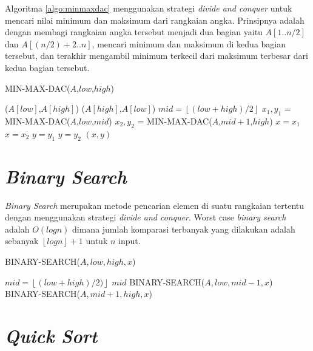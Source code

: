 Algoritma \ref{algo:minmaxdac} menggunakan strategi \textit{divide and conquer} untuk mencari nilai minimum dan maksimum dari rangkaian angka. Prinsipnya adalah dengan membagi rangkaian angka tersebut menjadi dua bagian yaitu $A[1..n/2]$ dan $A[(n/2)+2..n]$, mencari minimum dan maksimum di kedua bagian tersebut, dan terakhir mengambil minimum terkecil dari maksimum terbesar dari kedua bagian tersebut.

\begin{algorithm}[H]
	\caption{MIN-MAX-DAC($A$,$low$,$high$)}
	\label{algo:minmaxdac}
	\begin{algorithmic}[1]
				\RETURN ($A[low]$,$A[high]$)
			\ELSE
				\RETURN ($A[high]$,$A[low]$)
			\ENDIF
		\ELSE
			\STATE $mid = \left\lfloor (low+high)/2\right\rfloor$
			\STATE $x_1,y_1$ = MIN-MAX-DAC($A$,$low$,$mid$)
			\STATE $x_2,y_2$ = MIN-MAX-DAC($A$,$mid+1$,$high$)
				\STATE $x = x_1$
			\ELSE
				\STATE $x = x_2$
			\ENDIF
				\STATE $y = y_1$
			\ELSE
				\STATE $y = y_2$
			\ENDIF  
			\RETURN $(x,y)$
		\ENDIF
	\end{algorithmic}
\end{algorithm}



\section{\textit{Binary Search}}

\textit{Binary Search} merupakan metode pencarian elemen di suatu rangkaian tertentu dengan menggunakan strategi \textit{divide and conquer}. Worst case \textit{binary search} adalah $O(log n)$ dimana jumlah komparasi terbanyak yang dilakukan adalah sebanyak $\left\lfloor log n \right\rfloor + 1$ untuk $n$ input.

\begin{algorithm}[H]
	\caption{BINARY-SEARCH($A,low,high,x$)}
	\begin{algorithmic}[1]
		\ELSE
			\STATE $mid = \left\lfloor(low+high)/2)\right\rfloor$
				\RETURN $mid$
				\RETURN BINARY-SEARCH($A,low,mid-1,x$) 
			\ELSE
				\RETURN BINARY-SEARCH($A,mid+1,high,x$)
			\ENDIF
		\ENDIF
	\end{algorithmic}
\end{algorithm}



\section{\textit{Quick Sort}}

